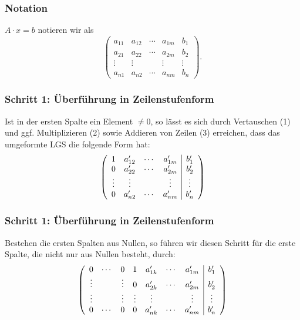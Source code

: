 %
%
\begin{frame}\frametitle{Notation}

	$A\cdot x = b$ notieren wir als\\[3mm]
	
	$$	
		\left(
		\begin{array}{cccc|c}
			a_{11}	&a_{12}	&\cdots	&a_{1m}	&b_1\\
			a_{21} 	&a_{22} 	&\cdots 	&a_{2m} 	&b_2\\
			\vdots 	&\vdots   	&            	&\vdots   	&\vdots\\
			a_{n1} 	&a_{n2} 	&\cdots 	&a_{nm} 	&b_n
		\end{array}
		\right).
	$$
	
\end{frame}
%
%
\begin{frame}\frametitle{Schritt 1: \"Uberführung in Zeilenstufenform}

	Ist in der ersten Spalte ein Element $\neq 0$, 
	so lässt es sich durch Vertauschen (1) und ggf. Multiplizieren (2) sowie Addieren von Zeilen (3) erreichen, 
	dass das umgeformte LGS die folgende Form hat:\\[5mm]
	
	$$
		\left(
		\begin{array}{cccc | c}
			1		&a'_{12}	&\cdots	&a'_{1m}	&b'_1\\
			0 		&a'_{22}	&\cdots	&a'_{2m}	&b'_2\\
			\vdots	&\vdots   	&            	&\vdots   	&\vdots\\
			0 		&a'_{n2} 	&\cdots 	&a'_{nm} 	&b'_n
		\end{array}
		\right)
	$$
	
\end{frame}
%
%
\begin{frame}\frametitle{Schritt 1: \"Uberführung in Zeilenstufenform}

	Bestehen die ersten Spalten aus Nullen, 
	so führen wir diesen Schritt für die erste Spalte, die nicht nur aus Nullen besteht, durch:\\[5mm]
	
	$$
		\left(
		\begin{array}{ccccccc | c}
			0		&\cdots 	& 0 		& 1 		& a'_{1k} 	& \cdots 	& a'_{1m} 	& b'_1\\
			\vdots 	& 		& \vdots 	& 0 		& a'_{2k} 	& \cdots 	& a'_{2m} & b'_2\\
			\vdots 	&  		&\vdots 	& \vdots  	& \vdots    & 	   	& \vdots	& \vdots\\
			0		&\cdots 	& 0 		& 0 		& a'_{nk} 	& \cdots 	& a'_{nm} 	& b'_n
		\end{array}
		\right)
	$$
	
\end{frame}
